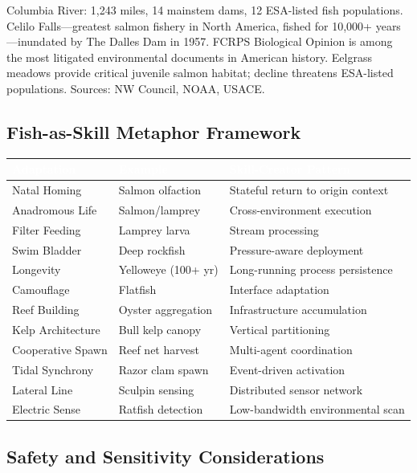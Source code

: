 \documentclass[11pt,letterpaper]{article}
\newcommand{\tableheader}[1]{\textbf{\sffamily\textcolor{white}{#1}}}
\begin{document}
Columbia River: 1,243 miles, 14 mainstem dams, 12 ESA-listed fish populations. Celilo Falls---greatest salmon fishery in North America, fished for 10,000+ years---inundated by The Dalles Dam in 1957. FCRPS Biological Opinion is among the most litigated environmental documents in American history. Eelgrass meadows provide critical juvenile salmon habitat; decline threatens ESA-listed populations. Sources: NW Council, NOAA, USACE.

\subsection{Fish-as-Skill Metaphor Framework}

\begin{center}
\begin{tabularx}{\textwidth}{L{2.5cm}L{3cm}X}
\toprule
{}
\tableheader{Adaptation} & \tableheader{Example} & \tableheader{Skill-Creator Pattern} \\
\midrule
Natal Homing & Salmon olfaction & Stateful return to origin context \\
Anadromous Life & Salmon/lamprey & Cross-environment execution \\
Filter Feeding & Lamprey larva & Stream processing \\
Swim Bladder & Deep rockfish & Pressure-aware deployment \\
Longevity & Yelloweye (100+ yr) & Long-running process persistence \\
Camouflage & Flatfish & Interface adaptation \\
Reef Building & Oyster aggregation & Infrastructure accumulation \\
Kelp Architecture & Bull kelp canopy & Vertical partitioning \\
Cooperative Spawn & Reef net harvest & Multi-agent coordination \\
Tidal Synchrony & Razor clam spawn & Event-driven activation \\
Lateral Line & Sculpin sensing & Distributed sensor network \\
Electric Sense & Ratfish detection & Low-bandwidth environmental scan \\
\bottomrule
\end{tabularx}
\end{center}

\subsection{Safety and Sensitivity Considerations}
\end{document}
